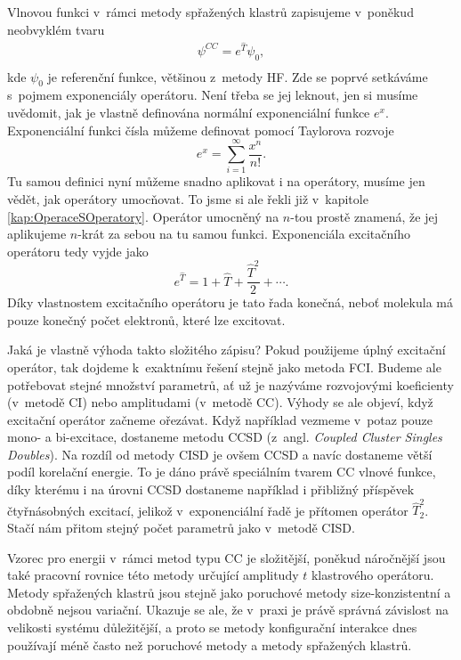 Vlnovou funkci v~rámci metody spřažených klastrů zapisujeme v~poněkud neobvyklém tvaru
\begin{eqnarray}
\psi^{CC} = e^{\hat{T}} \psi_0 ,  \\
\end{eqnarray}
kde $\psi_0$ je referenční funkce, většinou z~metody HF. Zde se poprvé setkáváme s~pojmem exponenciály operátoru. Není třeba se jej leknout, jen si musíme uvědomit, jak je vlastně definována normální exponenciální funkce $e^x$. Exponenciální funkci čísla můžeme definovat pomocí Taylorova rozvoje
\begin{equation}
e^x=\sum_{i=1}^\infty \frac{x^n}{n!} .
\end{equation}
Tu samou definici nyní můžeme snadno aplikovat i na operátory, musíme jen vědět, jak operátory umocňovat.
To jsme si ale řekli již v~kapitole \ref{kap:OperaceSOperatory}. Operátor umocněný na $n$-tou prostě znamená, že jej aplikujeme $n$-krát za sebou na tu samou funkci. Exponenciála excitačního operátoru tedy vyjde jako 
\begin{equation}
e^{\hat{T}} = 1+\hat{T}+\frac{\hat{T}^2}{2}+\cdots.
\end{equation}
Díky vlastnostem excitačního operátoru je tato řada konečná, neboť molekula má pouze konečný počet elektronů, které lze excitovat.

Jaká je vlastně výhoda takto složitého zápisu?
Pokud použijeme úplný excitační operátor, tak dojdeme k~exaktnímu řešení stejně jako metoda FCI. Budeme ale potřebovat stejné množství parametrů, ať už je nazýváme rozvojovými koeficienty (v~metodě CI) nebo amplitudami (v~metodě CC).
Výhody se ale objeví, když excitační operátor začneme ořezávat. Když například vezmeme v~potaz pouze mono- a bi-excitace, dostaneme metodu CCSD  (z~angl. \textit{Coupled Cluster Singles Doubles}).
Na rozdíl od metody CISD je ovšem CCSD  a navíc dostaneme větší podíl korelační energie.
To je dáno právě speciálním tvarem CC vlnové funkce, díky kterému i na úrovni CCSD dostaneme například i přibližný příspěvek čtyřnásobných excitací, jelikož v~exponenciální řadě je přítomen operátor $\hat{T}_2^2$. Stačí nám přitom stejný počet parametrů jako v~metodě CISD.

Vzorec pro energii v~rámci metod typu CC je složitější, poněkud náročnější jsou také pracovní rovnice této metody určující amplitudy $t$ klastrového operátoru. Metody spřažených klastrů jsou stejně jako poruchové metody size-konzistentní a obdobně nejsou variační. Ukazuje se ale, že v~praxi je právě správná závislost na velikosti systému důležitější, a proto se metody konfigurační interakce dnes používají méně často než poruchové metody a metody spřažených klastrů.

